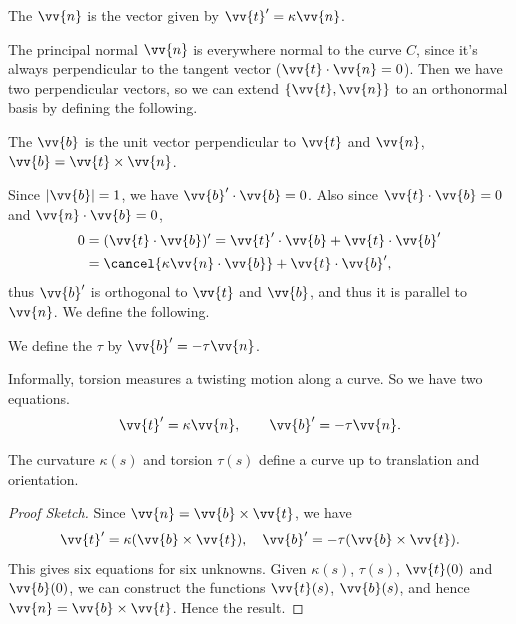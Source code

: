 \begin{definition}
	The  $\vv{n}$ is the vector given by $\vv{t}' = \kappa \vv{n}$.
\end{definition}

The principal normal $\vv{n}$ is everywhere normal to the curve $C$, since it's always perpendicular to the tangent vector ($\vv{t} \cdot \vv{n} = 0$). Then we have two perpendicular vectors, so we can extend $\{\vv{t}, \vv{n}\}$ to an orthonormal basis by defining the following.

\begin{definition}[Binormal]
	The  $\vv{b}$ is the unit vector perpendicular to $\vv{t}$ and $\vv{n}$, $\vv{b} = \vv{t} \times \vv{n}$. 
\end{definition}

Since $|\vv{b}| = 1$, we have $\vv{b}' \cdot \vv{b} = 0$. Also since $\vv{t} \cdot \vv{b} = 0$ and $\vv{n} \cdot \vv{b} = 0$,
\begin{align*}
	0 &= (\vv{t} \cdot \vv{b})' = \vv{t}' \cdot \vv{b} + \vv{t} \cdot \vv{b}'  \\
	&= \cancel{\kappa \vv{n} \cdot \vv{b}} + \vv{t} \cdot \vv{b}',
\end{align*}
thus $\vv{b}'$ is orthogonal to $\vv{t}$ and $\vv{b}$, and thus it is parallel to $\vv{n}$. We define the following.

\begin{definition}[Torsion]
	We define the  $\tau$ by $\vv{b}' = - \tau \vv{n}$.
\end{definition}

Informally, torsion measures a twisting motion along a curve.
So we have two equations.
$$
\vv{t}' = \kappa \vv{n}, \quad \quad \vv{b}' = - \tau \vv{n}.
$$

\begin{proposition}
	The curvature $\kappa(s)$ and torsion $\tau(s)$ define a curve up to translation and orientation.
\end{proposition}
\begin{proof}[Proof Sketch]
	Since $\vv{n} = \vv{b} \times \vv{t}$, we have
	$$
	\vv{t}' = \kappa (\vv{b} \times \vv{t}), \quad \vv{b}' = - \tau (\vv{b} \times \vv{t}).
	$$
	This gives six equations for six unknowns. Given $\kappa(s)$, $\tau(s)$, $\vv{t}(0)$ and $\vv{b}(0)$, we can construct the functions $\vv{t}(s)$, $\vv{b}(s)$, and hence $\vv{n} = \vv{b} \times \vv{t}$. Hence the result.
\end{proof}

